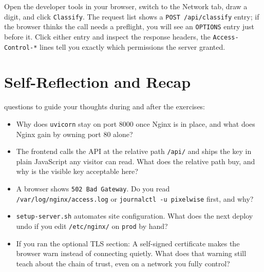 Open the developer tools in your browser, switch to the Network tab,
draw a digit, and click \texttt{Classify}.
The request list shows a \texttt{POST /api/classify} entry; if the
browser thinks the call needs a preflight, you will see an
\texttt{OPTIONS} entry just before it.
Click either entry and inspect the response headers, the
\texttt{Access-Control-*} lines tell you exactly which permissions the
server granted.

\fi


\newpage
\section{Self-Reflection and Recap}

 questions to guide your thoughts during and after the exercises:
\begin{itemize}
    \item Why does \texttt{uvicorn} stay on port 8000 once Nginx is in place, and what does Nginx gain by owning port 80 alone?
    \item The frontend calls the API at the relative path \texttt{/api/} and ships the key in plain JavaScript any visitor can read. What does the relative path buy, and why is the visible key acceptable here?
    \item A browser shows \texttt{502 Bad Gateway}. Do you read \texttt{/var/log/nginx/access.log} or \texttt{journalctl -u pixelwise} first, and why?
    \item \texttt{setup-server.sh} automates site configuration. What does the next deploy undo if you edit \texttt{/etc/nginx/} on \texttt{prod} by hand?
    \item If you ran the optional TLS section: A self-signed certificate makes the browser warn instead of connecting quietly. What does that warning still teach about the chain of trust, even on a network you fully control?
\end{itemize}

